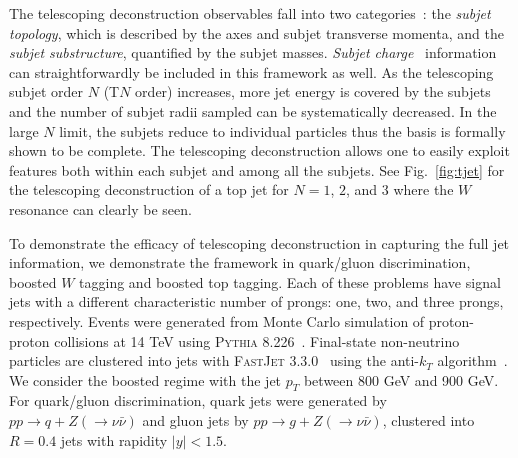 \documentclass[notoc]{JHEP3}
\DeclareRobustCommand{\Fig}[1]{Fig.~\ref{#1}}
\begin{document}
The telescoping deconstruction observables fall into two categories~\cite{Chien:2017xrb}: the {\sl subjet topology}, which is described by the axes and subjet transverse momenta, and the {\sl subjet substructure}, quantified by the subjet masses. {\sl Subjet charge}~\cite{Krohn:2012fg} information can straightforwardly be included in this framework as well. As the telescoping subjet order $N$ (T$N$ order) increases, more jet energy is covered by the subjets and the number of subjet radii sampled can be systematically decreased. In the large $N$ limit, the subjets reduce to individual particles %
thus the basis is formally shown to be complete. The telescoping deconstruction allows one to easily exploit features both within each subjet and among all the subjets. See \Fig{fig:tjet} for the telescoping deconstruction of a top jet for $N = 1$, $2$, and $3$ where the $W$ resonance can clearly be seen.

To demonstrate the efficacy of telescoping deconstruction in capturing the full jet information,
we demonstrate the framework in quark/gluon discrimination, boosted $W$ tagging and boosted top tagging. Each of these problems have
signal jets with a different characteristic number of prongs: one, two, and three prongs, respectively. Events were generated from Monte Carlo simulation of proton-proton collisions at 14 TeV using \textsc{Pythia} 8.226~\cite{Sjostrand:2007gs}. Final-state non-neutrino particles are clustered into jets with \textsc{FastJet} 3.3.0~\cite{Cacciari:2011ma} using the anti-$k_T$ algorithm~\cite{Cacciari:2008gp}. We consider the boosted regime with the jet $p_T$ between 800 GeV and 900 GeV. For quark/gluon discrimination, quark jets were generated by $pp\to q+Z(\to\nu\bar\nu)$ and gluon jets %
by $pp\to g + Z(\to\nu\bar\nu)$, clustered into $R=0.4$ jets with rapidity $|y|<1.5$.
\end{document}
